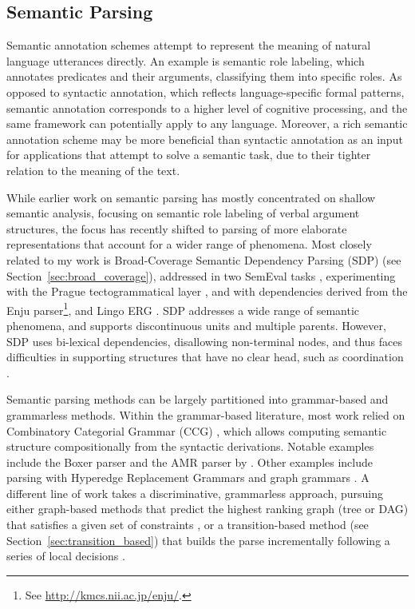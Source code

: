 \documentclass[11pt]{article}
\newcommand{\secref}[1]{Section~\ref{#1}}
\begin{document}
\subsection{Semantic Parsing}

Semantic annotation schemes attempt to represent the meaning of natural
language utterances directly. An example is semantic role
labeling\cite{baker1998framenet}\cite{paass2014semantic}, which annotates
predicates and their arguments, classifying them into specific roles. As
opposed to syntactic annotation, which reflects language-specific formal
patterns, semantic annotation corresponds to a higher level of cognitive
processing, and the same framework can potentially apply to any language.
Moreover, a rich semantic annotation scheme may be more beneficial than
syntactic annotation as an input for applications that attempt to solve a
semantic task, due to their tighter relation to the meaning of the text.

While earlier work on semantic parsing has mostly concentrated on shallow semantic analysis,
focusing on semantic role labeling of verbal argument structures,
the focus has recently shifted to parsing of more elaborate representations that account
for a wider range of phenomena. 
Most closely related to my work is Broad-Coverage Semantic Dependency Parsing (SDP)
(see \secref{sec:broad_coverage}),
addressed in two SemEval tasks \cite{oepen2014semeval,oepen2015semeval},
experimenting with the Prague tectogrammatical layer \cite{sgallhp:1986,bohmova2003prague},
and with dependencies derived from the Enju parser\footnote{See
\url{http://kmcs.nii.ac.jp/enju/}.}, and Lingo ERG \cite{Flic:02}.
SDP addresses a wide range of semantic phenomena,
and supports discontinuous units and multiple parents. However, SDP uses
bi-lexical dependencies, disallowing non-terminal nodes, and thus faces difficulties in supporting
structures that have no clear head, such as coordination \cite{Ivanova2012who}.

Semantic parsing methods can be largely partitioned into grammar-based and grammarless methods.
Within the grammar-based literature, most work relied on Combinatory Categorial Grammar (CCG)
\cite{Steedman:00}, which allows computing semantic structure compositionally from the
syntactic derivations. Notable examples include the Boxer parser \cite{bos2005towards}
and the AMR parser by \cite{artzi2015broad}.
Other examples include parsing with Hyperedge Replacement Grammars
\cite{jones2012semantics,chiang2013parsing,peng2015synchronous} and
graph grammars \cite{koller2015semantic}.
A different line of work takes a discriminative, grammarless approach,
pursuing either graph-based methods that predict the highest ranking graph
(tree or DAG) that satisfies a given set of constraints
\cite[for AMR parsing]{flanigan2014discriminative},
or a transition-based method (see \secref{sec:transition_based})
that builds the parse incrementally following a series of local
decisions \cite[and much subsequent work]{Nivre03anefficient}.
\end{document}
